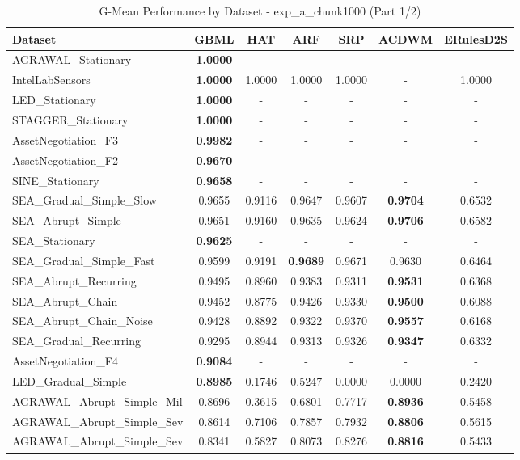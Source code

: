 \begin{table}[htbp]
\centering
\caption{G-Mean Performance by Dataset - exp_a_chunk1000 (Part 1/2)}
\label{tab:gmean_exp_a_chunk1000_1}
\footnotesize
\begin{tabular}{lcccccc}
\toprule
Dataset & GBML & HAT & ARF & SRP & ACDWM & ERulesD2S \\
\midrule
AGRAWAL_Stationary & \textbf{1.0000} & - & - & - & - & - \\
IntelLabSensors & \textbf{1.0000} & 1.0000 & 1.0000 & 1.0000 & - & 1.0000 \\
LED_Stationary & \textbf{1.0000} & - & - & - & - & - \\
STAGGER_Stationary & \textbf{1.0000} & - & - & - & - & - \\
AssetNegotiation_F3 & \textbf{0.9982} & - & - & - & - & - \\
AssetNegotiation_F2 & \textbf{0.9670} & - & - & - & - & - \\
SINE_Stationary & \textbf{0.9658} & - & - & - & - & - \\
SEA_Gradual_Simple_Slow & 0.9655 & 0.9116 & 0.9647 & 0.9607 & \textbf{0.9704} & 0.6532 \\
SEA_Abrupt_Simple & 0.9651 & 0.9160 & 0.9635 & 0.9624 & \textbf{0.9706} & 0.6582 \\
SEA_Stationary & \textbf{0.9625} & - & - & - & - & - \\
SEA_Gradual_Simple_Fast & 0.9599 & 0.9191 & \textbf{0.9689} & 0.9671 & 0.9630 & 0.6464 \\
SEA_Abrupt_Recurring & 0.9495 & 0.8960 & 0.9383 & 0.9311 & \textbf{0.9531} & 0.6368 \\
SEA_Abrupt_Chain & 0.9452 & 0.8775 & 0.9426 & 0.9330 & \textbf{0.9500} & 0.6088 \\
SEA_Abrupt_Chain_Noise & 0.9428 & 0.8892 & 0.9322 & 0.9370 & \textbf{0.9557} & 0.6168 \\
SEA_Gradual_Recurring & 0.9295 & 0.8944 & 0.9313 & 0.9326 & \textbf{0.9347} & 0.6332 \\
AssetNegotiation_F4 & \textbf{0.9084} & - & - & - & - & - \\
LED_Gradual_Simple & \textbf{0.8985} & 0.1746 & 0.5247 & 0.0000 & 0.0000 & 0.2420 \\
AGRAWAL_Abrupt_Simple_Mil & 0.8696 & 0.3615 & 0.6801 & 0.7717 & \textbf{0.8936} & 0.5458 \\
AGRAWAL_Abrupt_Simple_Sev & 0.8614 & 0.7106 & 0.7857 & 0.7932 & \textbf{0.8806} & 0.5615 \\
AGRAWAL_Abrupt_Simple_Sev & 0.8341 & 0.5827 & 0.8073 & 0.8276 & \textbf{0.8816} & 0.5433 \\

\end{tabular}
\end{table}
